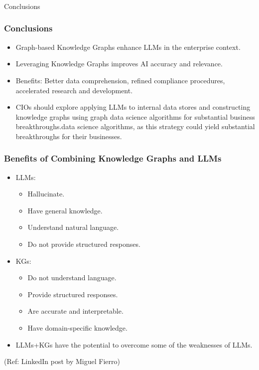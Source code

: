 \begin{frame}[fragile]\frametitle{}
\begin{center}
{\Large Conclusions}

\end{center}
\end{frame}


\begin{frame}[fragile]\frametitle{Conclusions}
\begin{itemize}
\item Graph-based Knowledge Graphs enhance LLMs in the enterprise context.
\item Leveraging Knowledge Graphs improves AI accuracy and relevance.
\item Benefits: Better data comprehension, refined compliance procedures, accelerated research and development.
\item CIOs should explore applying LLMs to internal data stores and constructing knowledge graphs using graph data science algorithms for substantial business breakthroughs.data science algorithms, as this strategy could yield substantial breakthroughs for their businesses.
\end{itemize}
\end{frame}

\begin{frame}[fragile]\frametitle{Benefits of Combining Knowledge Graphs and LLMs}

\begin{itemize}
\item LLMs:
	\begin{itemize}
	\item  Hallucinate.
	\item   Have general knowledge.
	\item   Understand natural language.
	\item   Do not provide structured responses.
	\end{itemize}

\item KGs:
	\begin{itemize}
	\item   Do not understand language.
	\item   Provide structured responses.
	\item   Are accurate and interpretable.
	\item   Have domain-specific knowledge.
	\end{itemize}

\item LLMs+KGs have the potential to overcome some of the weaknesses of LLMs.

\end{itemize}

{\tiny (Ref: LinkedIn post by Miguel Fierro)}


\end{frame}

